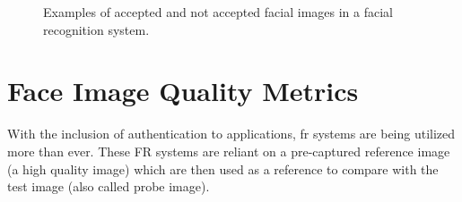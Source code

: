 \begin{figure}[h]
    
\caption{Examples of accepted and not accepted facial images in a facial recognition system.}
\label{fig:image_properties}

\end{figure}

\section{Face Image Quality Metrics} 
\label{sec:FIQMs}
With the inclusion of authentication to applications, \acrlong{fr} systems are being utilized more than ever. These FR systems are reliant on a pre-captured reference image (a high quality image) which are then used as a reference to compare with the test image (also called probe image). 

